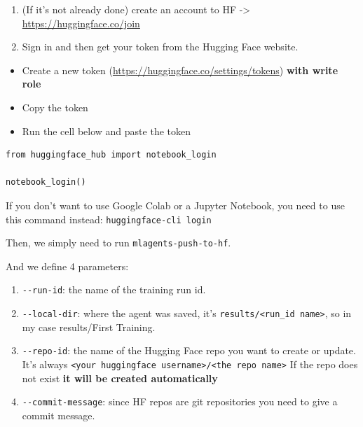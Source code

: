 \documentclass[11pt,a4paper]{article}
\begin{document}
\begin{enumerate}
\def\labelenumi{\arabic{enumi}.}
\item
  (If it's not already done) create an account to HF -\textgreater{} \url{https://huggingface.co/join}
\item
  Sign in and then get your token from the Hugging Face website.
\end{enumerate}

\begin{itemize}
\tightlist
\item
  Create a new token (\url{https://huggingface.co/settings/tokens}) \textbf{with write role}
\end{itemize}


\begin{itemize}
\tightlist
\item
  Copy the token
\item
  Run the cell below and paste the token
\end{itemize}

\begin{lstlisting}
from huggingface_hub import notebook_login

notebook_login()
\end{lstlisting}

If you don't want to use Google Colab or a Jupyter Notebook, you need to use this command instead: \texttt{huggingface-cli\ login}

Then, we simply need to run \texttt{mlagents-push-to-hf}.


And we define 4 parameters:

\begin{enumerate}
\def\labelenumi{\arabic{enumi}.}
\tightlist
\item
  \texttt{-\/-run-id}: the name of the training run id.
\item
  \texttt{-\/-local-dir}: where the agent was saved, it's \texttt{results/\textless{}run\_id\ name\textgreater{}}, so in my case results/First Training.
\item
  \texttt{-\/-repo-id}: the name of the Hugging Face repo you want to create or update. It's always \texttt{\textless{}your\ huggingface\ username\textgreater{}/\textless{}the\ repo\ name\textgreater{}} If the repo does not exist \textbf{it will be created automatically}
\item
  \texttt{-\/-commit-message}: since HF repos are git repositories you need to give a commit message.
\end{enumerate}
\end{document}
